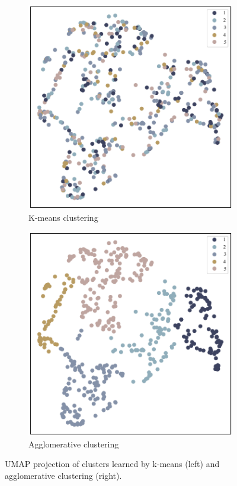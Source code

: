 \documentclass[]{ceurart}
\begin{document}
\begin{figure}
\centering
\begin{subfigure}{.5\textwidth}
  \centering
  \includegraphics[width=.9\linewidth]{figures/img4.png}
  \caption{K-means clustering}
  \label{fig:sub1}
\end{subfigure}%
\begin{subfigure}{.5\textwidth}
  \centering
  \includegraphics[width=.9\linewidth]{figures/img5.png}
  \caption{Agglomerative clustering}
  \label{fig:sub2}
\end{subfigure}
\caption{UMAP projection of clusters learned by k-means (left) and agglomerative clustering (right).}
\label{fig:clustering_projections}
\end{figure}
\end{document}
